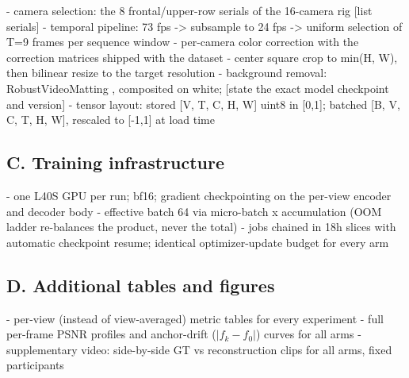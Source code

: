 - camera selection: the 8 frontal/upper-row serials of the 16-camera rig [list serials]
- temporal pipeline: 73 fps -> subsample to 24 fps -> uniform selection of T=9 frames per sequence window
- per-camera color correction with the correction matrices shipped with the dataset
- center square crop to min(H, W), then bilinear resize to the target resolution
- background removal: RobustVideoMatting \cite{lin2022robust}, composited on white; [state the exact model checkpoint and version]
- tensor layout: stored [V, T, C, H, W] uint8 in [0,1]; batched [B, V, C, T, H, W], rescaled to [-1,1] at load time

\subsection*{C. Training infrastructure}

- one L40S GPU per run; bf16; gradient checkpointing on the per-view encoder and decoder body
- effective batch 64 via micro-batch x accumulation (OOM ladder re-balances the product, never the total)
- jobs chained in 18h slices with automatic checkpoint resume; identical optimizer-update budget for every arm

\subsection*{D. Additional tables and figures}

- per-view (instead of view-averaged) metric tables for every experiment
- full per-frame PSNR profiles and anchor-drift ($|f_k - f_0|$) curves for all arms
- supplementary video: side-by-side GT vs reconstruction clips for all arms, fixed participants

